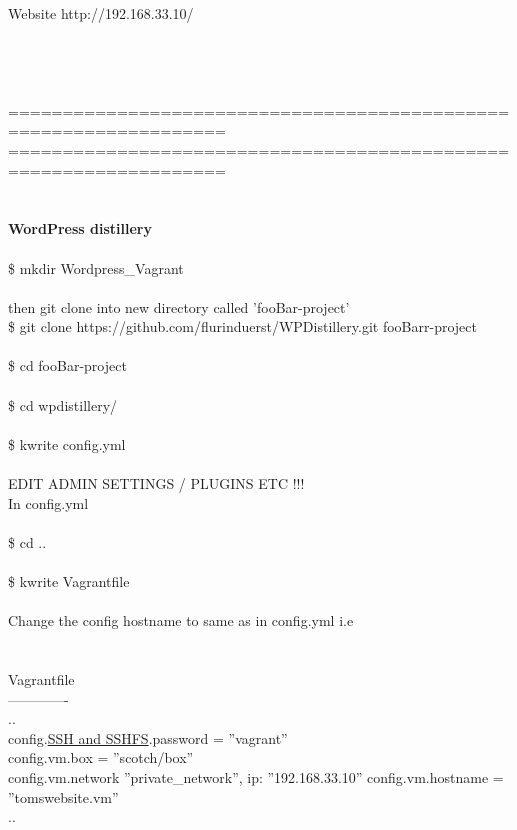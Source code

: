 \documentclass[10pt,a4paper]{article}
\begin{document}
{{{{{{{{{{{{{{{{{{{{{{{{\\
\\
\\
Website http://192.168.33.10/\\
\\
\\
\\
\\
==================================================================\\
==================================================================\\
\\
\\
\textbf{{\Large WordPress distillery}}\\
\\
\$ mkdir Wordpress\_Vagrant\\
\\
then git clone into new directory called 'fooBar-project'\\
\$ git clone https://github.com/flurinduerst/WPDistillery.git fooBarr-project\\
\\
\$ cd fooBar-project\\
\\
\$ cd wpdistillery/\\
\\
\$ kwrite config.yml\\
\\
EDIT ADMIN SETTINGS / PLUGINS ETC !!!\\
In    config.yml\\
\\
\$ cd ..\\
\\
\$ kwrite Vagrantfile\\
\\
Change the config hostname to same as in config.yml i.e\\
\\
\\
Vagrantfile\\
-------------\\
..\\
 {\small    config.\hyperlink{ssh___and_sshfs}{SSH   and SSHFS}}{\small .password = ''vagrant''\\
    config.vm.box = ''scotch/box''\\
    config.vm.network ''private\_network'', ip: ''192.168.33.10''} config.vm.hostname = ''tomswebsite.vm''\\
..\\
}}}}}}}}}}}}}}}}}}}}}}}}
\end{document}
